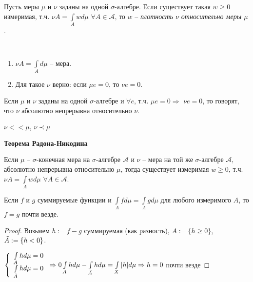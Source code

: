 \begin{definition}
    Пусть меры $\mu$ и $\nu$ заданы на одной $\sigma$-алгебре. Если существует 
    такая $w\geq 0$ измеримая, т.ч. $\nu A = \int\limits_{A}wd\mu$ $\forall A\in \mathcal{A}$,
    то $w$ – \textit{плотность $\nu$ относительно меры $\mu$}.
\end{definition}

\begin{remark}~
    \begin{enumerate}
        \item $\nu A = \int\limits_A d\mu$ – мера.
        
        \item Для такое $\nu$ верно: если $\mu e=0$, то $\nu e=0$.
    \end{enumerate}
\end{remark}

\begin{definition}
    Если $\mu$ и $\nu$ заданы на одной $\sigma$-алгебре и $\forall e$, т.ч. $\mu e=0\Rightarrow$
    $\nu e = 0$, то говорят, что $\nu$ абсолютно непрерывна относительно $\nu$.

    $\nu << \mu$, $\nu \prec \mu$
\end{definition}

\begin{theorem}
    \textbf{Теорема Радона-Никодина}

    Если $\mu$ – $\sigma$-конечная мера на $\sigma$-алгебре $\mathcal{A}$ и $\nu$ – мера на той же $\sigma$-алгебре 
    $\mathcal{A}$, абсолютно непрерывна относительно $\mu$, тогда существует измеримая $w\geq 0$, т.ч.
    $\nu A = \int\limits_{A}wd\mu$ $\forall A\in \mathcal{A}$.
\end{theorem}

\begin{theorem}
    Если $f$ и $g$ суммируемые функции и $\int\limits_{A}fd\mu=\int\limits_{A}gd\mu$ для любого 
    измеримого $A$, то $f=g$ почти везде.
\end{theorem}

\begin{proof}
    Возьмем $h:=f-g$ суммируемая (как разность), $A:=\{h\geq 0\}$, $\Tilde{A}:=\{h<0\}$.

    $\left\{\begin{array}{c}
        \int\limits_{A}hd\mu=0 \\
        \int\limits_{\Tilde{A}}hd\mu=0
    \end{array}\right.\Rightarrow 0 \int\limits_{A}hd\mu - \int\limits_{\Tilde{A}}hd\mu= \int\limits_{X}|h|d\mu
    \Rightarrow h =0$ почти везде
\end{proof}

